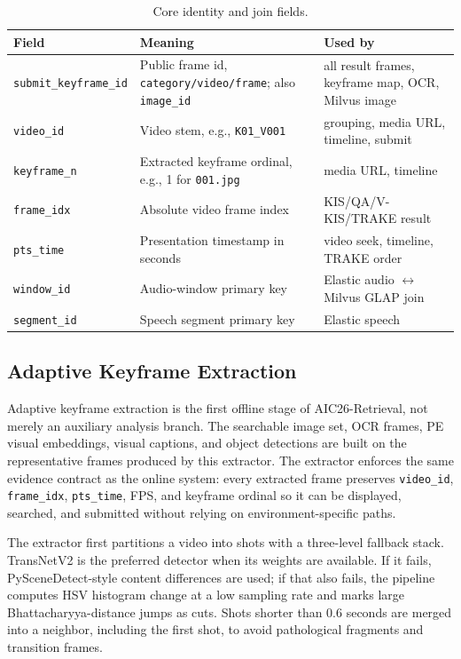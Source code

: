 \documentclass[conference]{IEEEtran}
\newcommand{\sys}{AIC26-Retrieval}
\newcommand{\sid}{\texttt{submit\_keyframe\_id}}
\newcommand{\vid}{\texttt{video\_id}}
\newcommand{\fid}{\texttt{frame\_idx}}
\newcommand{\kfn}{\texttt{keyframe\_n}}
\newcommand{\ptstime}{\texttt{pts\_time}}
\begin{document}
\begin{table}[!t]
\centering
\caption{Core identity and join fields.}
\label{tab:contracts}
\scriptsize
\setlength{\tabcolsep}{2pt}
\begin{tabularx}{\columnwidth}{@{}>{\raggedright\arraybackslash}p{}X>{\raggedright\arraybackslash}p{}@{}}
\toprule
Field & Meaning & Used by \\
\midrule
\sid & Public frame id, \texttt{category/video/frame}; also \texttt{image\_id} & all result frames, keyframe map, OCR, Milvus image \\
\vid & Video stem, e.g., \texttt{K01\_V001} & grouping, media URL, timeline, submit \\
\kfn & Extracted keyframe ordinal, e.g., 1 for \texttt{001.jpg} & media URL, timeline \\
\fid & Absolute video frame index & KIS/QA/V-KIS/TRAKE result \\
\ptstime & Presentation timestamp in seconds & video seek, timeline, TRAKE order \\
\texttt{window\_id} & Audio-window primary key & Elastic audio $\leftrightarrow$ Milvus GLAP join \\
\texttt{segment\_id} & Speech segment primary key & Elastic speech \\
\bottomrule
\end{tabularx}
\end{table}

\subsection{Adaptive Keyframe Extraction}

Adaptive keyframe extraction is the first offline stage of \sys{}, not merely
an auxiliary analysis branch. The searchable image set, OCR frames, PE visual
embeddings, visual captions, and object detections are built on the
representative frames produced by this extractor. The extractor enforces the
same evidence contract as the online system: every extracted frame preserves
\vid{}, \fid{}, \ptstime{}, FPS, and keyframe ordinal so it can be displayed,
searched, and submitted without relying on environment-specific paths.

The extractor first partitions a video into shots with a three-level fallback
stack. TransNetV2 \cite{soucek2020transnetv2} is the preferred detector when its
weights are available. If it fails, PySceneDetect-style content differences are
used; if that also fails, the pipeline computes HSV histogram change at a low
sampling rate and marks large Bhattacharyya-distance jumps as cuts. Shots shorter
than 0.6 seconds are merged into a neighbor, including the first shot, to avoid
pathological fragments and transition frames.
\end{document}
